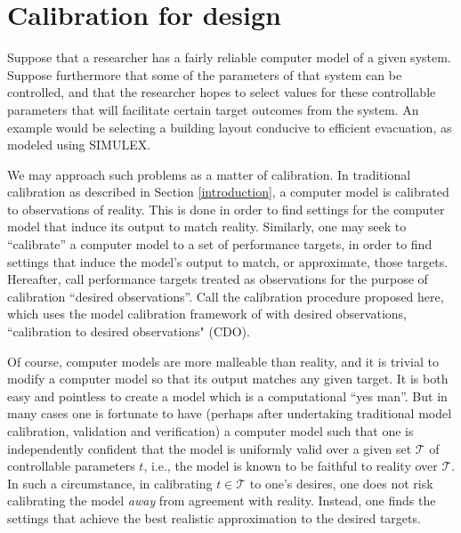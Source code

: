 \documentclass{article}
\begin{document}
\section{Calibration for design}\label{calib_for_design}


Suppose that a researcher has a fairly reliable computer model of a given system. Suppose furthermore that some of the parameters of that system can be controlled, and that the researcher hopes to select values for these controllable parameters that will facilitate certain target outcomes from the system. An example would be selecting a building layout conducive to efficient evacuation, as modeled using SIMULEX.

We may approach such problems as a matter of calibration. In traditional calibration as described in Section \ref{introduction}, a computer model is calibrated to observations of reality. This is done in order to find settings for the computer model that induce its output to match reality. Similarly, one may seek to ``calibrate'' a computer model to a set of performance targets, in order to find settings that induce the model's output to match, or approximate, those targets. Hereafter, call performance targets treated as observations for the purpose of calibration ``desired observations''. Call the calibration procedure proposed here, which uses the model calibration framework of \cite{Kennedy2001} with desired observations, ``calibration to desired observations" (CDO). 

Of course, computer models are more malleable than reality, and it is trivial to modify a computer model so that its output matches any given target. It is both easy and pointless to create a model which is a computational ``yes man''. But in many cases one is fortunate to have (perhaps after undertaking traditional model calibration, validation and verification) a computer model such that one is independently confident that the model is uniformly valid over a given set $\mathcal T$ of controllable parameters $t$, i.e., the model is known to be faithful to reality over $\mathcal T$. In such a circumstance, in calibrating $t\in\mathcal T$ to one's desires, one does not risk calibrating the model \emph{away} from agreement with reality. 
Instead, one finds the settings that achieve the best realistic approximation to the desired targets.
\end{document}
